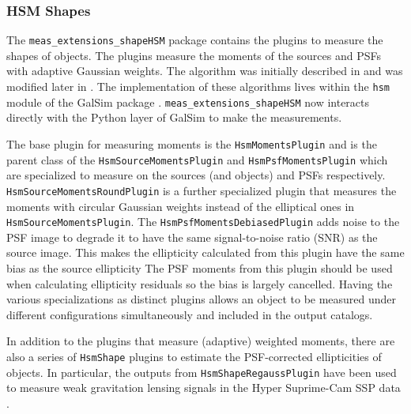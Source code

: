 \subsubsection{HSM Shapes}
\label{sec:hsm}

The \texttt{meas\_extensions\_shapeHSM} package contains the plugins to measure the shapes of objects.
The plugins measure the moments of the sources and PSFs with adaptive Gaussian weights.
The algorithm was initially described in \citet{2003MNRAS.343..459H} and was modified later in \citet{2005MNRAS.361.1287M}.
The implementation of these algorithms lives within the \texttt{hsm} module of the GalSim package \citep{2015A&C....10..121R}.
\texttt{meas\_extensions\_shapeHSM} now interacts directly with the Python layer of GalSim to make the measurements.

The base plugin for measuring moments is the \texttt{HsmMomentsPlugin} and is the parent class of the \texttt{HsmSourceMomentsPlugin} and \texttt{HsmPsfMomentsPlugin} which are specialized to measure on the sources (and objects) and PSFs respectively.
\texttt{HsmSourceMomentsRoundPlugin} is a further specialized plugin that measures the moments with circular Gaussian weights instead of the elliptical ones in \texttt{HsmSourceMomentsPlugin}.
The \texttt{HsmPsfMomentsDebiasedPlugin} adds noise to the PSF image to degrade it to have the same signal-to-noise ratio (SNR) as the source image.
This makes the ellipticity calculated from this plugin have the same bias as the source ellipticity
The PSF moments from this plugin should be used when calculating ellipticity residuals so the bias is largely cancelled.
Having the various specializations as distinct plugins allows an object to be measured under different configurations simultaneously and included in the output catalogs.

In addition to the plugins that measure (adaptive) weighted moments, there are also a series of \texttt{HsmShape} plugins to estimate the PSF-corrected ellipticities of objects.
In particular, the outputs from \texttt{HsmShapeRegaussPlugin} have been used to measure weak gravitation lensing signals in the Hyper Suprime-Cam SSP data \citep{2018PASJ...70S..25M, 2022PASJ...74..421L}.
